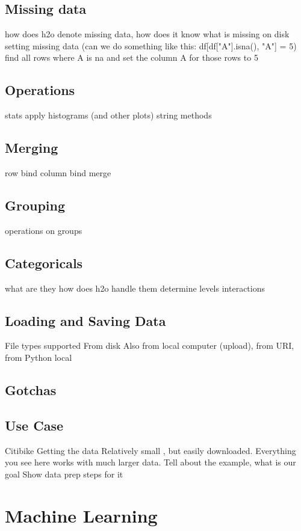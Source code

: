 \subsection{Missing data}
how does h2o denote missing data, how does it know what is missing on disk
setting missing data (can we do something like this: df[df["A"].isna(), "A"] = 5)
find all rows where A is na and set the column A for those rows to 5

\subsection{Operations}
stats
apply
histograms (and other plots)
string methods

\subsection{Merging}
row bind
column bind
merge

\subsection{Grouping}
operations on groups


\subsection{Categoricals}
what are they
how does h2o handle them
determine levels
interactions

\subsection{Loading and Saving Data}
File types supported
From disk
Also from local computer (upload), from URI, from Python local


\subsection{Gotchas}

\subsection{Use Case}
Citibike
Getting the data
Relatively small , but easily downloaded.  Everything you see here works with much larger data.
Tell about the example, what is our goal
Show data prep steps for it

\section{Machine Learning}

